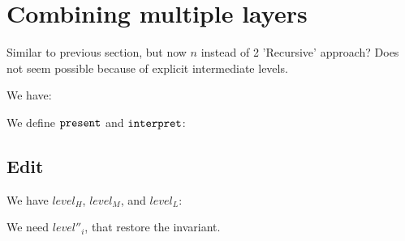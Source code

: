 %
%





%																
%																
%																
\section{Combining multiple layers}

\bl
\* Similar to previous section, but now $n$ instead of 2
\* 'Recursive' approach? Does not seem possible because of explicit intermediate levels.
\el

We have:


We define ${\tt present}$ and ${\tt interpret}$:





\subsection{Edit}

We have $level_{H}$, $level_{M}$, and $level_{L}$:


We need $level''_i$,   that restore the invariant.



